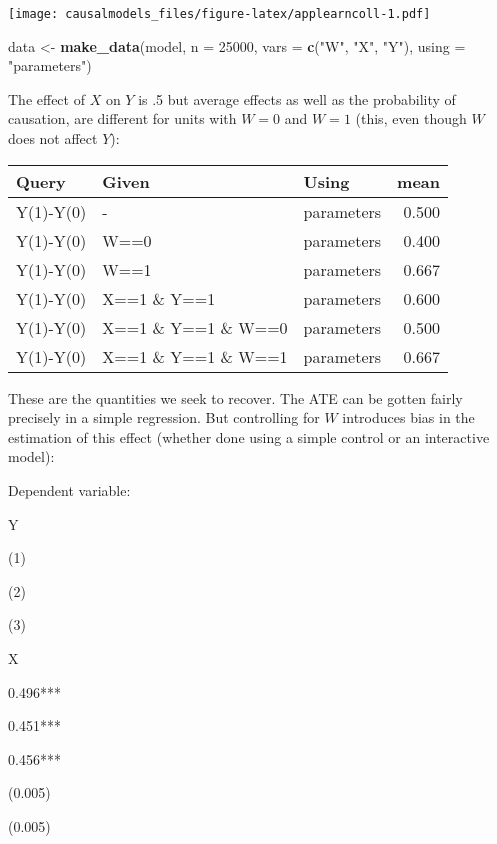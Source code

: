\documentclass[
  12pt,
]{book}
\newenvironment{Shaded}{\begin{snugshade}}{\end{snugshade}}
\newcommand{\DataTypeTok}[1]{\textcolor[rgb]{0.13,0.29,0.53}{#1}}
\newcommand{\DecValTok}[1]{\textcolor[rgb]{0.00,0.00,0.81}{#1}}
\newcommand{\KeywordTok}[1]{\textcolor[rgb]{0.13,0.29,0.53}{\textbf{#1}}}
\newcommand{\NormalTok}[1]{#1}
\newcommand{\StringTok}[1]{\textcolor[rgb]{0.31,0.60,0.02}{#1}}
\begin{document}
\texttt{[image: causalmodels\_files/figure-latex/applearncoll-1.pdf]}

\begin{Shaded}
\begin{Highlighting}[]
\NormalTok{data <-}\StringTok{ }\KeywordTok{make_data}\NormalTok{(model, }
                  \DataTypeTok{n =} \DecValTok{25000}\NormalTok{, }
                  \DataTypeTok{vars =} \KeywordTok{c}\NormalTok{(}\StringTok{"W"}\NormalTok{, }\StringTok{"X"}\NormalTok{, }\StringTok{"Y"}\NormalTok{), }
                  \DataTypeTok{using =} \StringTok{"parameters"}\NormalTok{)}
\end{Highlighting}
\end{Shaded}

The effect of \(X\) on \(Y\) is .5 but average effects as well as the probability of causation, are different for units with \(W=0\) and \(W=1\) (this, even though \(W\) does not affect \(Y\)):

\begin{tabular}{l|l|l|r}
\hline
Query & Given & Using & mean\\
\hline
Y(1)-Y(0) & - & parameters & 0.500\\
\hline
Y(1)-Y(0) & W==0 & parameters & 0.400\\
\hline
Y(1)-Y(0) & W==1 & parameters & 0.667\\
\hline
Y(1)-Y(0) & X==1 \& Y==1 & parameters & 0.600\\
\hline
Y(1)-Y(0) & X==1 \& Y==1 \& W==0 & parameters & 0.500\\
\hline
Y(1)-Y(0) & X==1 \& Y==1 \& W==1 & parameters & 0.667\\
\hline
\end{tabular}

These are the quantities we seek to recover. The ATE can be gotten fairly precisely in a simple regression. But controlling for \(W\) introduces bias in the estimation of this effect (whether done using a simple control or an interactive model):

Dependent variable:

Y

(1)

(2)

(3)

X

0.496***

0.451***

0.456***

(0.005)

(0.005)
\end{document}
